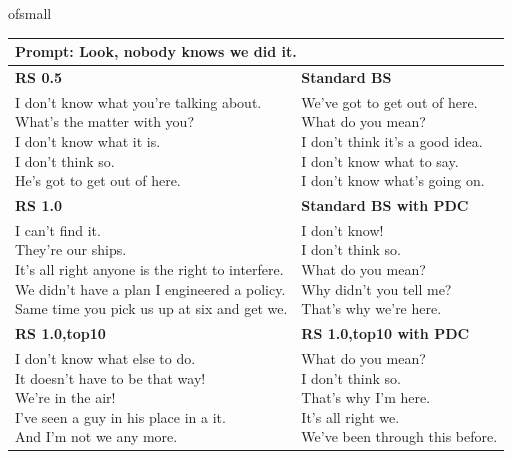 \begin{table}[t]
    \centering
   ofsmall
    \begin{tabular}{|l|l|}
    \hline
    \multicolumn{2}{|l|}{\rule{0pt}{0.35cm} \textbf{Prompt:} Look, nobody knows we did it.}  \\ 
    \hline \hline
    \textbf{RS 0.5} &  \textbf{Standard BS} \\
    \hline
\makecell[l]{
I don't know what you're talking about. \\
What's the matter with you? \\
I don't know what it is. \\
I don't think so. \\
He's got to get out of here. \\
}&
\makecell[l]{
We've got to get out of here. \\
What do you mean? \\
I don't think it's a good idea. \\
I don't know what to say. \\
I don't know what's going on. \\
}\\
    \hline
    \hline
    \textbf{RS 1.0} & \textbf{Standard BS with PDC} \\
    \hline
    
\makecell[l]{
I can't find it. \\
They're our ships. \\
It's all right anyone is the right to interfere. \\
We didn't have a plan I engineered a policy. \\
Same time you pick us up at six and get we. \\
}&
\makecell[l]{
I don't know! \\
I don't think so. \\
What do you mean? \\
Why didn't you tell me? \\
That's why we're here. \\
}\\
    \hline
    \hline
    \textbf{RS 1.0,top10} & \textbf{RS 1.0,top10 with PDC} \\
    \hline
\makecell[l]{
I don't know what else to do. \\
It doesn't have to be that way! \\
We're in the air! \\
I've seen a guy in his place in a it. \\
And I'm not we any more. \\
}&
\makecell[l]{
What do you mean? \\
I don't think so. \\
That's why I'm here. \\
It's all right we. \\
We've been through this before. \\
}\\
\hline
\hline



\end{tabular}
\end{table}
